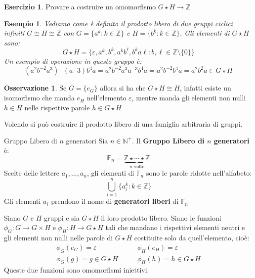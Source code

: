 \documentclass[11pt,a4paper,twoside]{article}
\newcommand{\vareps}{\varepsilon}
\newtheorem{es}{Esempio}
\theoremstyle{definition}
\newtheorem*{oss}{Osservazione}
\newtheorem*{ese}{Esercizio}
\begin{document}
\begin{ese}
	Provare a costruire un omomorfismo $G \star H \to \mathbb Z$
\end{ese}

\begin{es}
	Vediamo come è definito il prodotto libero di due gruppi ciclici infiniti $G \cong H \cong \mathbb Z$ con $G = \{a^k : k \in \mathbb Z\}$ e $H = \{b^k : k \in \mathbb Z\}$. Gli elementi di $G \star H$ sono:
	\[ G\star H = \{\vareps, a^k, b^k, a^k b^\ell, b^k a\ell : b, \ell \in \mathbb Z \setminus\{0\}\}\]
	Un esempio di operazione in questo gruppo è:
	\[ (a^2b^{-2}a^3)\cdot (a^-3)b^4a = a^2b^{-2}a^3a^{-3}b^4a = a^2b^{-2}b^4a = a^2b^2a \in G \star H \]
\end{es}

\begin{oss}
	Se $G = \{e_G\}$ allora si ha che $G \star H \cong H$, infatti esiste un isomorfismo che manda $e_H$ nell'elemento $\vareps$, mentre manda gli elementi non nulli $h \in H$ nelle rispettive parole $h \in G \star H$
\end{oss}

Volendo si può costruire il prodotto libero di una famiglia arbitraria di gruppi.

\begin{defn}{Gruppo Libero di $n$ generatori}{}
	Sia $n \in \mathbb N^+$. Il \textbf{Gruppo Libero di $n$ generatori} è:
	\[ \mathbb F_n = \underbrace{\mathbb Z \star \cdots \star \mathbb Z}_{n \text{ volte}}\]
	Scelte delle lettere $a_1,...,a_n$, gli elementi di $\mathbb F_n$ sono le parole ridotte nell'alfabeto:
	\[\bigcup_{i =1}^n\{a_i^k: k\in \mathbb Z\}\]
	Gli elementi $a_i$ prendono il nome di \textbf{generatori liberi} di $\mathbb F_n$
\end{defn}

\begin{thm}{}{}
	Siano $G$ e $H$ gruppi e sia $G \star H$ il loro prodotto libero. Siano le funzioni $\phi_G : G \to G \times H$ e $\phi_H:H \to G\star H$ tali che mandano i rispettivi elementi neutri e gli elementi non nulli nelle parole di $G \star H$ costituite solo da quell'elemento, cioè:
	\[ \begin{matrix}\phi_G(e_G) = \vareps\\ \phi_G(g) = g \in G \star H\end{matrix} \qquad \begin{matrix} \phi_H(e_H) = \vareps\\ \phi_H(h) = h\in G \star H\end{matrix}\]
	Queste due funzioni sono omomorfismi iniettivi.
\end{thm}
\end{document}
